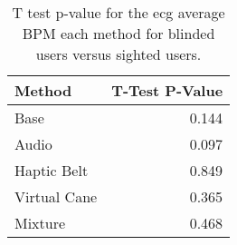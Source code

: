
\begin{table}[!htb]
\centering
\caption{T test p-value for the ecg average BPM each method for blinded users versus sighted users.}
\label{tab:ttest_ecg_bpm}
\begin{tabular}{lr}
\toprule
      Method &  T-Test P-Value \\
\midrule
        Base &           0.144 \\
       Audio &           0.097 \\
 Haptic Belt &           0.849 \\
Virtual Cane &           0.365 \\
     Mixture &           0.468 \\
\bottomrule
\end{tabular}
\end{table}

